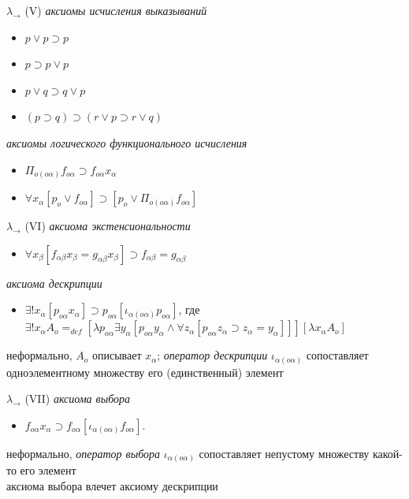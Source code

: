 \documentclass{beamer}
\begin{document}
\begin{frame}{$\lambda_\to$ (V)}
\textit{аксиомы исчисления выказываний}\\
\begin{itemize}
  \item $p \vee p \supset p$
  \item $p \supset p \vee p$
  \item $p \vee q \supset q \vee p$
  \item $(p \supset q) \supset (r \vee p \supset r \vee q)$
\end{itemize}
\bigskip
\textit{аксиомы логического функционального исчисления}\\
\begin{itemize}
  \item $\Pi_{o (o \alpha)} f_{o \alpha} \supset f_{o \alpha} x_\alpha$
  \item $\forall x_\alpha [p_o \vee f_{o \alpha}] \supset [p_o \vee \Pi_{o(o \alpha)} f_{o \alpha}]$
\end{itemize}
\end{frame}

\begin{frame}{$\lambda_\to$ (VI)}
\textit{аксиома экстенсиональности}\\
\bigskip
\begin{itemize}
  \item $\forall x_\beta [f_{\alpha \beta} x_\beta = g_{\alpha \beta} x_\beta] \supset f_{\alpha \beta} = g_{\alpha \beta}$
\end{itemize}
\bigskip
\textit{аксиома дескрипции}\\
\begin{itemize}
  \item $\exists ! x_\alpha [p_{o \alpha} x_\alpha] \supset p_{o \alpha} [\iota_{\alpha(o \alpha)}p_{o \alpha}]$, где $\exists ! x_\alpha A_o =_{def} [\lambda p_{o \alpha} \exists y_\alpha[p_{o \alpha} y_\alpha \wedge \forall z_\alpha[p_{o \alpha} z_\alpha \supset z_\alpha = y_\alpha]]][\lambda x_\alpha A_o]$
\end{itemize}
\bigskip
неформально, $A_o$ описывает $x_\alpha$; \textit{оператор дескрипции} $\iota_{\alpha (o \alpha)}$ сопоставляет одноэлементному множеству его (единственный) элемент
\end{frame}

\begin{frame}{$\lambda_\to$ (VII)}
\textit{аксиома выбора}\\
\bigskip
\begin{itemize}
  \item $f_{o \alpha} x_\alpha \supset f_{o \alpha} [\iota_{\alpha (o \alpha)} f_{o \alpha}].$
\end{itemize}
\bigskip
неформально, \textit{оператор выбора} $\iota_{\alpha (o \alpha)}$ сопоставляет непустому множеству какой-то его элемент\\
\bigskip
аксиома выбора влечет аксиому дескрипции
\end{frame}
\end{document}
